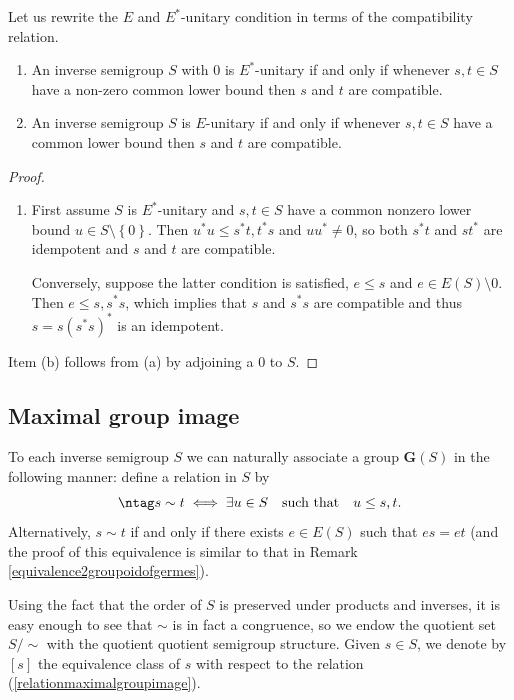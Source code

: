 Let us rewrite the $E$ and $E^*$-unitary condition in terms of the compatibility relation.

\begin{lemma}\cite[Theorem~2.4.6]{MR1694900}\label{lemmacompatibilityeunitary}
\begin{enumerate}
\item[(a)] An inverse semigroup $S$ with $0$ is $E^*$-unitary if and only if whenever $s,t\in S$ have a non-zero common lower bound then $s$ and $t$ are compatible.
\item[(b)] An inverse semigroup $S$ is $E$-unitary if and only if whenever $s,t\in S$ have a common lower bound then $s$ and $t$ are compatible.
\end{enumerate}
\end{lemma}
\begin{proof}
\begin{enumerate}
\item[(a)] First assume $S$ is $E^*$-unitary and $s,t\in S$ have a common nonzero lower bound $u\in S\setminus\left\{0\right\}$. Then $u^*u\leq s^*t,t^*s$ and $uu^*\neq 0$, so both $s^*t$ and $st^*$ are idempotent and $s$ and $t$ are compatible. 

Conversely, suppose the latter condition is satisfied, $e\leq s$ and $e\in E(S)\setminus 0$. Then $e\leq s, s^*s$, which implies that $s$ and $s^*s$ are compatible and thus $s=s(s^*s)^*$ is an idempotent.
\end{enumerate}
Item (b) follows from (a) by adjoining a $0$ to $S$.\qedhere
\end{proof}

\subsection{Maximal group image}

To each inverse semigroup $S$ we can naturally associate a group $\mathbf{G}(S)$ in the following manner: define a relation in $S$ by
\[\ntag\label{relationmaximalgroupimage}
s\sim t\iff\exists u\in S\quad\text{such that}\quad u\leq s,t.\]
Alternatively, $s\sim t$ if and only if there exists $e\in E(S)$ such that $es=et$ (and the proof of this equivalence is similar to that in Remark \ref{equivalence2groupoidofgermes}).

Using the fact that the order of $S$ is preserved under products and inverses, it is easy enough to see that $\sim$ is in fact a congruence, so we endow the quotient set $S/{\sim}$ with the quotient quotient semigroup structure. Given $s\in S$, we denote by $[s]$ the equivalence class of $s$ with respect to the relation (\ref{relationmaximalgroupimage}).

